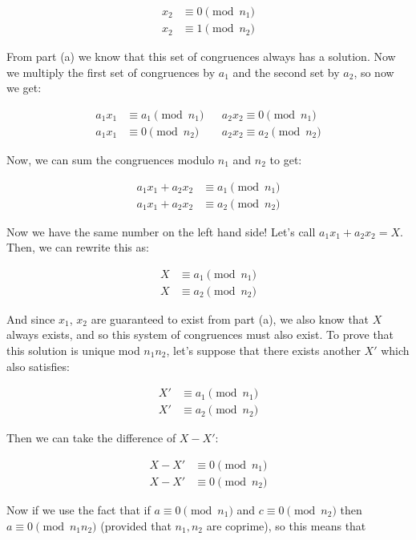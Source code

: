 \documentclass[11pt]{article}
\begin{document}
\begin{Parts}
\begin{solution}
    \begin{align*}
        x_2 &\equiv 0 \pmod{n_1}\\
        x_2 &\equiv 1 \pmod{n_2}
    \end{align*}

    From part (a) we know that this set of congruences always has a solution. Now we multiply the first set of congruences by $a_1$ and the second set by $a_2$, so now we get:

    \begin{align*}
        a_1x_1 &\equiv a_1 \pmod{n_1} && a_2x_2 \equiv 0 \pmod{n_1}\\
        a_1x_1 &\equiv 0 \pmod{n_2} && a_2x_2 \equiv a_2 \pmod{n_2}
    \end{align*}

    Now, we can sum the congruences modulo $n_1$ and $n_2$ to get:

    \begin{align*}
        a_1x_1 + a_2x_2 &\equiv a_1 \pmod{n_1}\\
        a_1x_1 + a_2x_2 &\equiv a_2 \pmod{n_2}
    \end{align*}

    Now we have the same number on the left hand side! Let's call $a_1x_1 + a_2x_2 = X$. Then, we can rewrite this as:

    \begin{align*}
        X &\equiv a_1 \pmod{n_1}\\
        X &\equiv a_2 \pmod{n_2}
    \end{align*}

    And since $x_1$, $x_2$ are guaranteed to exist from part (a), we also know that $X$ always exists, and so this system of congruences must also exist. To prove that this solution is unique mod $n_1n_2$, let's suppose that there exists another $X'$ which also satisfies:

    \begin{align*}
        X' &\equiv a_1 \pmod{n_1}\\
        X' &\equiv a_2 \pmod{n_2}
    \end{align*}

    Then we can take the difference of $X - X'$: 

    \begin{align*}
        X - X' &\equiv 0 \pmod{n_1}\\
        X - X' &\equiv 0 \pmod{n_2}
    \end{align*}

    Now if we use the fact that if $a \equiv 0 \pmod{n_1} $ and $c \equiv 0 \pmod {n_2}$ then $a \equiv 0 \pmod{n_1n_2}$ (provided that $n_1, n_2$ are coprime), so this means that 


\end{solution}
\end{Parts}
\end{document}
